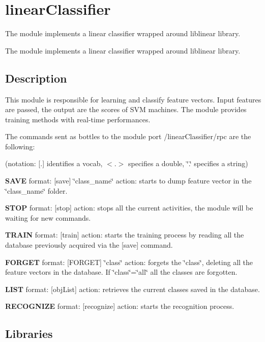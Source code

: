 \section{linear\+Classifier}
\label{group__icub__linearClassifier}


The module implements a linear classifier wrapped around liblinear library.  


The module implements a linear classifier wrapped around liblinear library. 

\hypertarget{group__icub__sparseCoder_intro_sec}{}\subsection{Description}\label{group__icub__sparseCoder_intro_sec}
This module is responsible for learning and classify feature vectors. Input features are passed, the output are the scores of S\+V\+M machines. The module provides training methods with real-\/time performances.

The commands sent as bottles to the module port /linear\+Classifier/rpc are the following\+:

(notation\+: \mbox{[}.\mbox{]} identifies a vocab, $<$.$>$ specifies a double, \char`\"{}.\char`\"{} specifies a string)

{\bfseries S\+A\+V\+E} format\+: \mbox{[}save\mbox{]} \char`\"{}class\+\_\+name\char`\"{} action\+: starts to dump feature vector in the \char`\"{}class\+\_\+name\char`\"{} folder.

{\bfseries S\+T\+O\+P} format\+: \mbox{[}stop\mbox{]} action\+: stops all the current activities, the module will be waiting for new commands.

{\bfseries T\+R\+A\+I\+N} format\+: \mbox{[}train\mbox{]} action\+: starts the training process by reading all the database previously acquired via the \mbox{[}save\mbox{]} command.

{\bfseries F\+O\+R\+G\+E\+T} format\+: \mbox{[}F\+O\+R\+G\+E\+T\mbox{]} \char`\"{}class\char`\"{} action\+: forgets the \char`\"{}class\char`\"{}, deleting all the feature vectors in the database. If \char`\"{}class\char`\"{}=\char`\"{}all\char`\"{} all the classes are forgotten.

{\bfseries L\+I\+S\+T} format\+: \mbox{[}obj\+List\mbox{]} action\+: retrieves the current classes saved in the database.

{\bfseries R\+E\+C\+O\+G\+N\+I\+Z\+E} format\+: \mbox{[}recognize\mbox{]} action\+: starts the recognition process.\hypertarget{group__icub__sparseCoder_lib_sec}{}\subsection{Libraries}\label{group__icub__sparseCoder_lib_sec}

